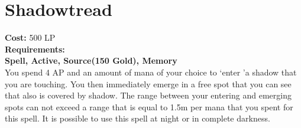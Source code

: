 \section{Shadowtread}\label{spell:shadowtread}
\textbf{Cost:} 500 LP\\
\textbf{Requirements:}\\
\textbf{Spell, Active, Source(150 Gold), Memory}\\
You spend 4 AP and an amount of mana of your choice to \lq enter \rq a shadow that you are touching.
You then immediately emerge in a free spot that you can see  that also is covered by shadow.
The range between your entering and emerging spots can not exceed a range that is equal to 1.5m per mana that you spent for this spell.
It is possible to use this spell at night or in complete darkness.\\